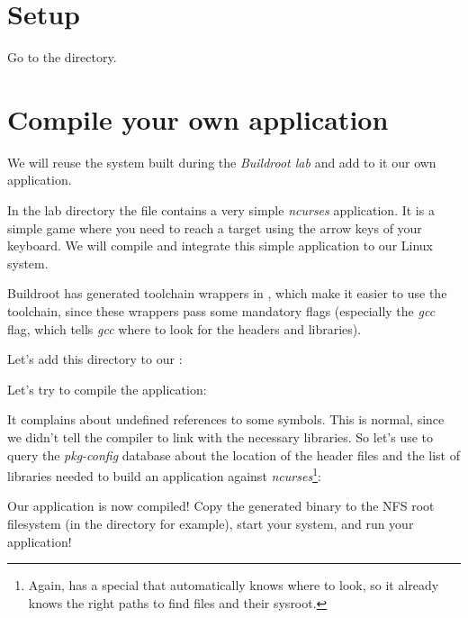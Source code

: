 
\section{Setup}

Go to the  directory.

\section{Compile your own application}

We will reuse the system built during the {\em Buildroot lab} and add
to it our own application.

In the lab directory the file  contains a very simple
{\em ncurses} application. It is a simple game where you need to reach
a target using the arrow keys of your keyboard.  We will compile and
integrate this simple application to our Linux system.

Buildroot has generated toolchain wrappers in
, which make it easier to use the toolchain,
since these wrappers pass some mandatory flags (especially the
 {\em gcc} flag, which tells {\em gcc} where to look
for the headers and libraries).

Let's add this directory to our :

\normalsize

Let's try to compile the application:


It complains about undefined references to some symbols. This is
normal, since we didn't tell the compiler to link with the necessary
libraries. So let's use  to query the {\em
pkg-config} database about the location of the header files and the
list of libraries needed to build an application against
{\em ncurses}\footnote{Again,  has a special
 that automatically knows where to look, so it
already knows the right paths to find  files and their
sysroot.}:


Our application is now compiled! Copy the generated binary to the NFS
root filesystem (in the  directory for example), start
your system, and run your application!

